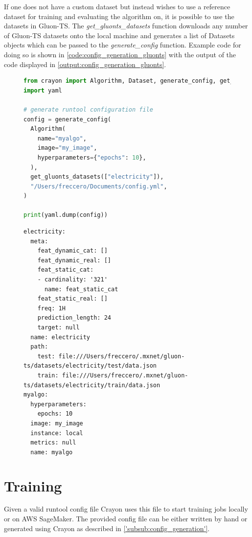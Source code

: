 If one does not have a custom dataset but instead wishes to use a reference dataset for training and evaluating the algorithm on, it is possible to use the datasets in Gluon-TS. The \textit{get\_gluonts\_datasets} function downloads any number of Gluon-TS datasets onto the local machine and generates a list of Datasets objects which can be passed to the  \textit{generate\_config} function. Example code for doing so is shown in \ref{code:config_generation_gluonts} with the output of the code displayed in \ref{output:config_generation_gluonts}.

\begin{figure}[h]
  \begin{lstlisting}[language=Python, label={code:config_generation_gluonts}, caption={Config generation using Crayon with gluonts datasets}]
from crayon import Algorithm, Dataset, generate_config, get_gluonts_datasets
import yaml

# generate runtool configuration file
config = generate_config(
  Algorithm(
    name="myalgo",
    image="my_image",
    hyperparameters={"epochs": 10},
  ),
  get_gluonts_datasets(["electricity"]),
  "/Users/freccero/Documents/config.yml",
)

print(yaml.dump(config))
    \end{lstlisting}
\end{figure}
\begin{figure}
  \begin{lstlisting}[label={output:config_generation_gluonts}, caption={Output when executing Code Fragment \ref{code:config_generation_gluonts}}]
electricity:
  meta:
    feat_dynamic_cat: []
    feat_dynamic_real: []
    feat_static_cat:
    - cardinality: '321'
      name: feat_static_cat
    feat_static_real: []
    freq: 1H
    prediction_length: 24
    target: null
  name: electricity
  path:
    test: file:///Users/freccero/.mxnet/gluon-ts/datasets/electricity/test/data.json
    train: file:///Users/freccero/.mxnet/gluon-ts/datasets/electricity/train/data.json
myalgo:
  hyperparameters:
    epochs: 10
  image: my_image
  instance: local
  metrics: null
  name: myalgo
    \end{lstlisting}
\end{figure}





\section{Training}
Given a valid runtool config file Crayon uses this file to start training jobs locally or on AWS SageMaker. The provided config file can be either written by hand or generated using Crayon as described in \ref{'subsub:config_generation'}.

